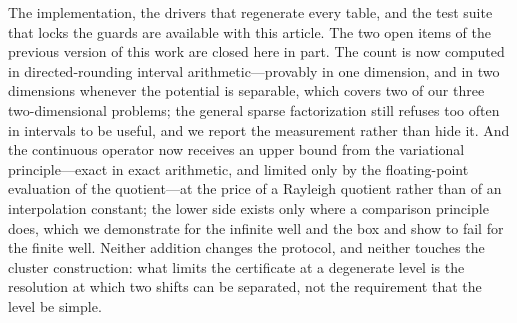 The implementation, the drivers that regenerate every table, and the test
suite that locks the guards are available with this article. The two open
items of the previous version of this work are closed here in part. The count
is now computed in directed-rounding interval arithmetic---provably in one
dimension, and in two dimensions whenever the potential is separable, which
covers two of our three two-dimensional problems; the general sparse
factorization still refuses too often in intervals to be useful, and we
report the measurement rather than hide it. And the continuous operator now
receives an upper bound from the variational principle---exact in exact
arithmetic, and limited only by the floating-point evaluation of the
quotient---at the price of a Rayleigh quotient rather than of an interpolation
constant; the lower
side exists only where a comparison principle does, which we demonstrate for
the infinite well and the box and show to fail for the finite well. Neither addition changes the
protocol, and neither touches the cluster construction: what limits the
certificate at a degenerate level is the resolution at which two shifts can
be separated, not the requirement that the level be simple.
